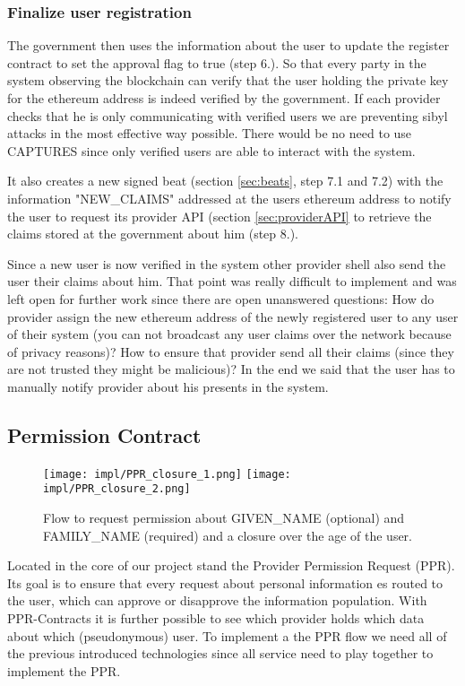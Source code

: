 \subsubsection{Finalize user registration}
The government then uses the information about the user to update the register contract to set the approval flag to true (step 6.). So that every party in the system observing the blockchain can verify that the user holding the private key for the ethereum address is indeed verified by the government. If each provider checks that he is only communicating with verified users we are preventing sibyl attacks in the most effective way possible. There would be no need to use CAPTURES since only verified users are able to interact with the system. 

It also creates a new signed beat (section \ref{sec:beats}, step 7.1 and 7.2) with the information "NEW\_CLAIMS" addressed at the users ethereum address to notify the user to request its provider API (section \ref{sec:providerAPI} to retrieve the claims stored at the government about him (step 8.). 

Since a new user is now verified in the system other provider shell also send the user their claims about him. That point was really difficult to implement and was left open for further work since there are open unanswered questions: How do provider assign the new ethereum address of the newly registered user to any user of their system (you can not broadcast any user claims over the network because of privacy reasons)? How to ensure that provider send all their claims (since they are not trusted they might be malicious)? 
In the end we said that the user has to manually notify provider about his presents in the system.

\subsection{Permission Contract}
\label{sec:ppr}

\begin{figure}
\texttt{[image: impl/PPR\_closure\_1.png]}
\texttt{[image: impl/PPR\_closure\_2.png]}
\centering
\caption{Flow to request permission about GIVEN\_NAME (optional) and FAMILY\_NAME (required) and a closure over the age of the user.}
\label{fig:ppr}
\end{figure}

Located in the core of our project stand the Provider Permission Request (PPR). Its goal is to ensure that every request about personal information es routed to the user, which can approve or disapprove the information population. With PPR-Contracts it is further possible to see which provider holds which data about which (pseudonymous) user. To implement a the PPR flow we need all of the previous introduced technologies since all service need to play together to implement the PPR. 

